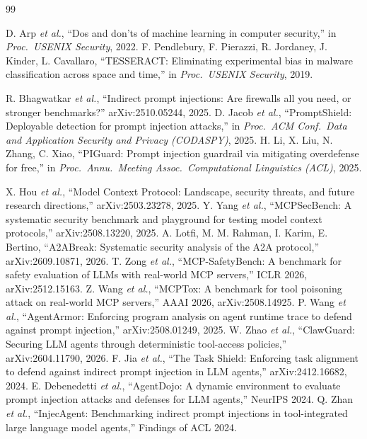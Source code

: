\documentclass[conference,compsoc]{IEEEtran}
\begin{document}

\begin{thebibliography}{99}

 D. Arp \textit{et al.}, ``Dos and don'ts of machine learning in computer security,'' in \textit{Proc.\ USENIX Security}, 2022.
 F. Pendlebury, F. Pierazzi, R. Jordaney, J. Kinder, L. Cavallaro, ``TESSERACT: Eliminating experimental bias in malware classification across space and time,'' in \textit{Proc.\ USENIX Security}, 2019.

 R. Bhagwatkar \textit{et al.}, ``Indirect prompt injections: Are firewalls all you need, or stronger benchmarks?'' arXiv:2510.05244, 2025.
 D. Jacob \textit{et al.}, ``PromptShield: Deployable detection for prompt injection attacks,'' in \textit{Proc.\ ACM Conf.\ Data and Application Security and Privacy (CODASPY)}, 2025.
 H. Li, X. Liu, N. Zhang, C. Xiao, ``PIGuard: Prompt injection guardrail via mitigating overdefense for free,'' in \textit{Proc.\ Annu.\ Meeting Assoc.\ Computational Linguistics (ACL)}, 2025.

 X. Hou \textit{et al.}, ``Model Context Protocol: Landscape, security threats, and future research directions,'' arXiv:2503.23278, 2025.
 Y. Yang \textit{et al.}, ``MCPSecBench: A systematic security benchmark and playground for testing model context protocols,'' arXiv:2508.13220, 2025.
 A. Lotfi, M. M. Rahman, I. Karim, E. Bertino, ``A2ABreak: Systematic security analysis of the A2A protocol,'' arXiv:2609.10871, 2026.
 T. Zong \textit{et al.}, ``MCP-SafetyBench: A benchmark for safety evaluation of LLMs with real-world MCP servers,'' ICLR 2026, arXiv:2512.15163.
 Z. Wang \textit{et al.}, ``MCPTox: A benchmark for tool poisoning attack on real-world MCP servers,'' AAAI 2026, arXiv:2508.14925.
 P. Wang \textit{et al.}, ``AgentArmor: Enforcing program analysis on agent runtime trace to defend against prompt injection,'' arXiv:2508.01249, 2025.
 W. Zhao \textit{et al.}, ``ClawGuard: Securing LLM agents through deterministic tool-access policies,'' arXiv:2604.11790, 2026.
 F. Jia \textit{et al.}, ``The Task Shield: Enforcing task alignment to defend against indirect prompt injection in LLM agents,'' arXiv:2412.16682, 2024.
 E. Debenedetti \textit{et al.}, ``AgentDojo: A dynamic environment to evaluate prompt injection attacks and defenses for LLM agents,'' NeurIPS 2024.
 Q. Zhan \textit{et al.}, ``InjecAgent: Benchmarking indirect prompt injections in tool-integrated large language model agents,'' Findings of ACL 2024.


\end{thebibliography}
\end{document}
